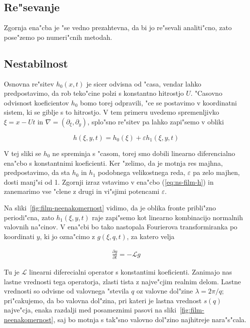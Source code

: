 \documentclass[a4paper,10pt]{article}
\newcommand{\eps}{\varepsilon}
\newcommand{\odv}[1]{\frac{\partial #1}{\partial t}}
\begin{document}
\subsection{Re"sevanje}

Zgornja ena"cba je "se vedno prezahtevna, da bi jo re"sevali analiti"cno, zato pose"zemo po numeri"cnih metodah. 

\subsection{Nestabilnost}

Osnovna re"sitev $h_0(x, t)$ je sicer odvisna od "casa, vendar lahko predpostavimo, da rob teko"cine polzi s konstantno hitrostjo $U$. "Casovno odvisnost koeficientov $h_0$ bomo torej odpravili, "ce se postavimo v koordinatni sistem, ki se giblje s to hitrostjo. V tem primeru uvedemo spremenljivko $\xi = x - Ut$ in $\nabla = (\partial_\xi, \partial_y)$, splo"sno re"sitev pa lahko zapi"semo v obliki

\begin{equation}
 h(\xi, y, t) = h_0(\xi) + \eps h_1(\xi, y, t)
\end{equation}

V tej sliki se $h_0$ ne spreminja s "casom, torej smo dobili linearno diferencialno ena"cbo s konstantnimi koeficienti. Ker "zelimo, da je motnja res majhna, predpostavimo, da sta $h_0$ in $h_1$ podobnega velikostnega reda, $\eps$ pa zelo majhen, dosti manj"si od 1. Zgornji izraz vstavimo v ena"cbo (\ref{eq:ns-film-h}) in zanemarimo vse "clene z drugi in vi"sjimi potencami $\eps$. 

Na sliki~\ref{fig:film-neenakomernost} vidimo, da je oblika fronte pribli"zno periodi"cna, zato $h_1(\xi, y, t)$ raje zapi"semo kot linearno kombinacijo normalnih valovnih na"cinov. V ena"cbi bo tako nastopala Fourierova transformiranka po koordinati $y$, ki jo ozna"cimo z $g(\xi, q, t)$, za katero velja

\begin{align}
 \odv{g} = -\mathcal{L}g
\end{align}

Tu je $\mathcal{L}$ linearni diferecialni operator s konstantimi koeficienti. Zanimajo nas lastne vrednosti tega operatorja, zlasti tista z najve"cjim realnim delom. Lastne vrednosti so odvisne od valovnega "stevila $q$ oz valovne dol"zine $\lambda = 2\pi/q$; pri"cakujemo, da bo valovna dol"zina, pri kateri je lastna vrednost $s(q)$ najve"cja, enaka razdalji med posameznimi pasovi na sliki~\ref{fig:film-neenakomernost}, saj bo motnja s tak"sno valovno dol"zino najhitreje nara"s"cala. 
\end{document}
